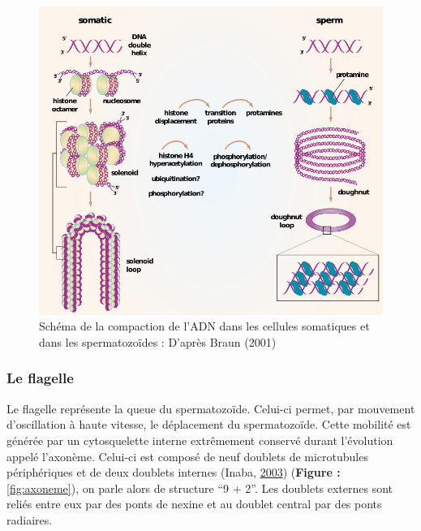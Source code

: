 \documentclass[12pt,twoside]{reedthesis}
\theoremstyle{definition}
\theoremstyle{definition}
\theoremstyle{remark}
\begin{document}
  \begin{figure}
  
  {\centering \includegraphics[scale=.55]{figure/noyau} 
  
  }
  
  \caption[Schéma de la compaction de l’ADN dans les cellules somatiques et dans les spermatozoïdes]{Schéma de la compaction de l’ADN dans les cellules somatiques et dans les spermatozoïdes : D'après Braun (2001)}\label{fig:noyau}
  \end{figure}
  
  \subsubsection{Le flagelle}\label{le-flagelle}
  
  Le flagelle représente la queue du spermatozoïde. Celui-ci permet, par
  mouvement d'oscillation à haute vitesse, le déplacement du
  spermatozoïde. Cette mobilité est générée par un cytosquelette interne
  extrêmement conservé durant l'évolution appelé l'axonème. Celui-ci est
  composé de neuf doublets de microtubules périphériques et de deux
  doublets internes (Inaba, \protect\hyperlink{ref-Inaba2003}{2003})
  (\textbf{Figure : }\ref{fig:axoneme}), on parle alors de structure ``9 +
  2''. Les doublets externes sont reliés entre eux par des ponts de nexine
  et au doublet central par des ponts radiaires.
  
\end{document}
